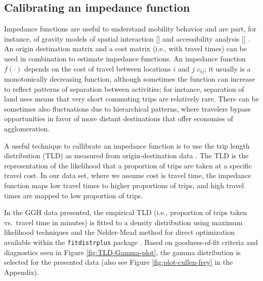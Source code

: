 \documentclass[Royal,times,sageh]{sagej}
\begin{document}
\hypertarget{calibrating-an-impedance-function}{%
\subsection{Calibrating an impedance
function}\label{calibrating-an-impedance-function}}

Impedance functions are useful to understand mobility behavior and are
part, for instance, of gravity models of spatial interaction {[}{]} and
accessibility analysis {[}{]} . An origin destination matrix and a cost
matrix (i.e., with travel times) can be used in combination to estimate
impedance functions. An impedance function \(f(\cdot)\) depends on the
cost of travel between locations \(i\) and \(j\) \(c_{ij}\); it usually
is a monotonically decreasing function, although sometimes the function
can increase to reflect patterns of separation between activities; for
instance, separation of land uses means that very short commuting trips
are relatively rare. There can be sometimes also fluctuations due to
hierarchical patterns, where travelers bypass opportunities in favor of
more distant destinations that offer economies of agglomeration.

A useful technique to callibrate an impedance function is to use the
trip length distribution (TLD) as measured from origin-destination data
\citep{horbachov_theoretical_2018, batista_estimation_2019}. The TLD is
the representation of the likelihood that a proportion of trips are
taken at a specific travel cost. In our data set, where we assume cost
is travel time, the impedance function maps low travel times to higher
proportions of trips, and high travel times are mapped to low proportion
of trips.

In the GGH data presented, the empirical TLD (i.e., proportion of trips
taken vs.~travel time in minutes) is fitted to a density distribution
using maximum likelihood techniques and the Nelder-Mead method for
direct optimization available within the \texttt{fitdistrplus} package
\citep{fitdistrplus_2015}. Based on goodness-of-fit criteria and
diagnostics seen in Figure \ref{fig:TLD-Gamma-plot}, the gamma
distribution is selected for the presented data (also see Figure
\ref{fig:plot-cullen-frey} in the Appendix).
\end{document}
